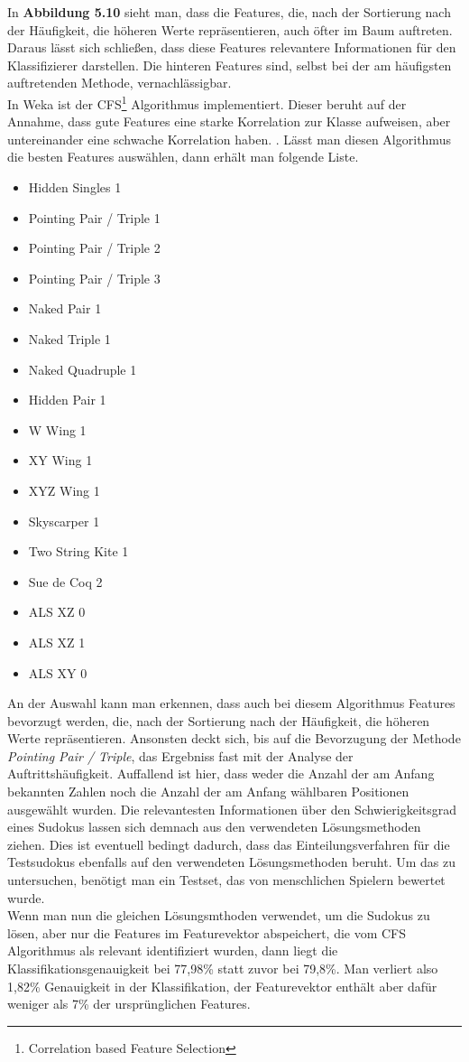 \noindent In \textbf{Abbildung 5.10} sieht man, dass die Features, die, nach der Sortierung nach der Häufigkeit, die höheren Werte repräsentieren, auch öfter im Baum auftreten. Daraus lässt sich schließen, dass diese Features relevantere Informationen für den Klassifizierer darstellen. Die hinteren Features sind, selbst bei der am häufigsten auftretenden Methode, vernachlässigbar.\\
In Weka ist der CFS\footnote{Correlation based Feature Selection} Algorithmus implementiert. Dieser beruht auf der Annahme, dass gute Features eine starke Korrelation zur Klasse aufweisen, aber untereinander eine schwache Korrelation haben. \cite{Hall1998}. Lässt man diesen Algorithmus die besten Features auswählen, dann erhält man folgende Liste.
\begin{itemize}
\item Hidden Singles 1
\item Pointing Pair / Triple 1
\item Pointing Pair / Triple 2
\item Pointing Pair / Triple 3
\item Naked Pair 1
\item Naked Triple 1
\item Naked Quadruple 1
\item Hidden Pair 1
\item W Wing 1
\item XY Wing 1
\item XYZ Wing 1
\item Skyscarper 1
\item Two String Kite 1
\item Sue de Coq 2
\item ALS XZ 0
\item ALS XZ 1
\item ALS XY 0
\end{itemize}
An der Auswahl kann man erkennen, dass auch bei diesem Algorithmus Features bevorzugt werden, die, nach der Sortierung nach der Häufigkeit, die höheren Werte repräsentieren. Ansonsten deckt sich, bis auf die Bevorzugung der Methode \textit{Pointing Pair / Triple}, das Ergebniss fast mit der Analyse der Auftrittshäufigkeit. Auffallend ist hier, dass weder die Anzahl der am Anfang bekannten Zahlen noch die Anzahl der am Anfang wählbaren Positionen ausgewählt wurden. Die relevantesten Informationen über den Schwierigkeitsgrad eines Sudokus lassen sich demnach aus den verwendeten Lösungsmethoden ziehen. Dies ist eventuell bedingt dadurch, dass das Einteilungsverfahren für die Testsudokus ebenfalls auf den verwendeten Lösungsmethoden beruht. Um das zu untersuchen, benötigt man ein Testset, das von menschlichen Spielern bewertet wurde.\\
Wenn man nun die gleichen Lösungsmthoden verwendet, um die Sudokus zu lösen, aber nur die Features im Featurevektor abspeichert, die vom CFS Algorithmus als relevant identifiziert wurden, dann liegt die Klassifikationsgenauigkeit bei 77,98\% statt zuvor bei 79,8\%. Man verliert also 1,82\% Genauigkeit in der Klassifikation, der Featurevektor enthält aber dafür weniger als 7\% der ursprünglichen Features.